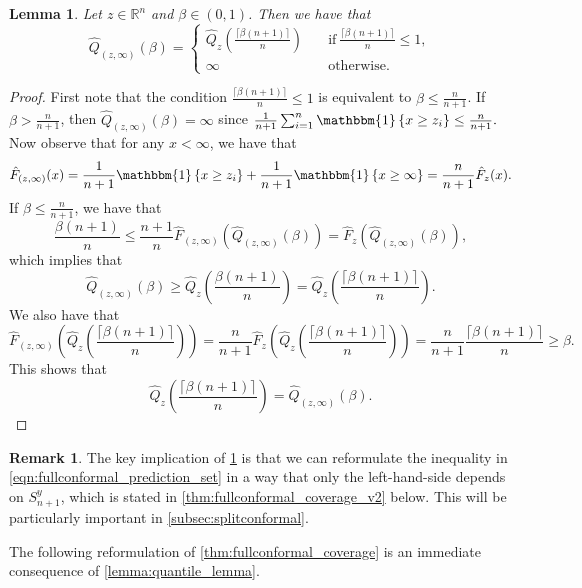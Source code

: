 \documentclass[11pt, titlepage]{article} %
\newcommand{\R}{\mathrm}
\newcommand{\Ind}[1]{\mathbbm{1}\left\{ #1 \right\}}
\numberwithin{equation}{section}
\newtheorem{lemma}{Lemma}
\theoremstyle{definition}
\newtheorem{remark}{Remark}
\numberwithin{theorem}{section}
\numberwithin{lemma}{section}
\numberwithin{corollary}{section}
\numberwithin{proposition}{section}
\numberwithin{definition}{section}
\numberwithin{remark}{section}
\begin{document}
\begin{lemma}
    Let \(z \in \mathbb{R}^n\) and \(\beta \in (0,1)\). Then we have that \[\hat{Q}_{(z,\infty)} (\beta) = \begin{cases}
        \hat{Q}_z\left( \frac{\lceil \beta (n+1) \rceil }{n} \right) \quad &\R{if} \ \frac{\lceil \beta(n+1) \rceil}{n} \leq 1, \\
        \infty \quad &\R{otherwise}.
        \end{cases}\]
\label{lemma:quantile_lemma_extra}
\end{lemma}
\begin{proof}
    First note that the condition \(\frac{\lceil \beta(n+1) \rceil}{n} \leq 1\) is equivalent to \(\beta \leq \frac{n}{n+1}\). If \(\beta > \frac{n}{n+1}\), then \(\hat{Q}_{(z, \infty)}(\beta) = \infty\) since \(\frac{1}{n+1}\sum_{i=1}^n \Ind{x \geq z_i} \leq \frac{n}{n+1}.\) Now observe that for any \(x < \infty\), we have that \[\hat{F}_{(z, \infty)}(x) = \frac{1}{n+1} \Ind{x \geq z_i} + \frac{1}{n+1}\Ind{x \geq \infty} = \frac{n}{n+1} \hat{F}_z(x).\] If \(\beta \leq \frac{n}{n+1}\), we have that \[\frac{\beta(n+1)}{n} \leq \frac{n+1}{n}  \hat{F}_{(z,\infty)}(\hat{Q}_{(z,\infty)}(\beta)) = \hat{F}_{z}(\hat{Q}_{(z,\infty)}(\beta)),\] which implies that \[\hat{Q}_{(z,\infty)}(\beta) \geq \hat{Q}_{z}\left(\frac{\beta(n+1)}{n}\right) = \hat{Q}_z\left( \frac{\lceil \beta (n+1) \rceil }{n} \right).\] We also have that \[\hat{F}_{(z, \infty)}\left( \hat{Q}_z\left( \frac{\lceil \beta (n+1) \rceil }{n} \right) \right) = \frac{n}{n+1} \hat{F}_{z}\left( \hat{Q}_z\left( \frac{\lceil \beta (n+1) \rceil }{n} \right) \right) = \frac{n}{n+1}\frac{\lceil \beta (n+1) \rceil }{n} \geq \beta. \] This shows that \[\hat{Q}_z\left( \frac{\lceil \beta (n+1) \rceil }{n} \right) = \hat{Q}_{(z, \infty)}(\beta).\]
\end{proof}

\begin{remark}
    The key implication of \cref{lemma:quantile_lemma_extra} is that we can reformulate the inequality in \eqref{eqn:fullconformal_prediction_set} in a way that only the left-hand-side depends on \(S_{n+1}^y\), which is stated in \cref{thm:fullconformal_coverage_v2} below. This will be particularly important in \cref{subsec:splitconformal}. 
\end{remark}

\noindent The following reformulation of \cref{thm:fullconformal_coverage} is an immediate consequence of \cref{lemma:quantile_lemma}.
\end{document}
